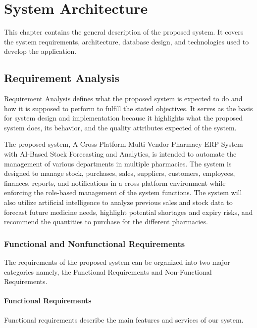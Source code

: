 \chapter{System Architecture}
This chapter contains the general description of the proposed system. It covers the system requirements, architecture, database design, and technologies used to develop the application.

\section{Requirement Analysis}
Requirement Analysis defines what the proposed system is expected to do and how it is supposed to perform to fulfill the stated objectives. It serves as the basis for system design and implementation because it highlights what the proposed system does, its behavior, and the quality attributes expected of the system.

The proposed system, A Cross-Platform Multi-Vendor Pharmacy ERP System with AI-Based Stock Forecasting and Analytics, is intended to automate the management of various departments in multiple pharmacies. The system is designed to manage stock, purchases, sales, suppliers, customers, employees, finances, reports, and notifications in a cross-platform environment while enforcing the role-based management of the system functions. The system will also utilize artificial intelligence to analyze previous sales and stock data to forecast future medicine needs, highlight potential shortages and expiry risks, and recommend the quantities to purchase for the different pharmacies.

\subsection{Functional and Nonfunctional Requirements}
The requirements of the proposed system can be organized into two major categories namely, the Functional Requirements and Non-Functional Requirements.

\subsubsection{Functional Requirements}
Functional requirements describe the main features and services of our system.\\

